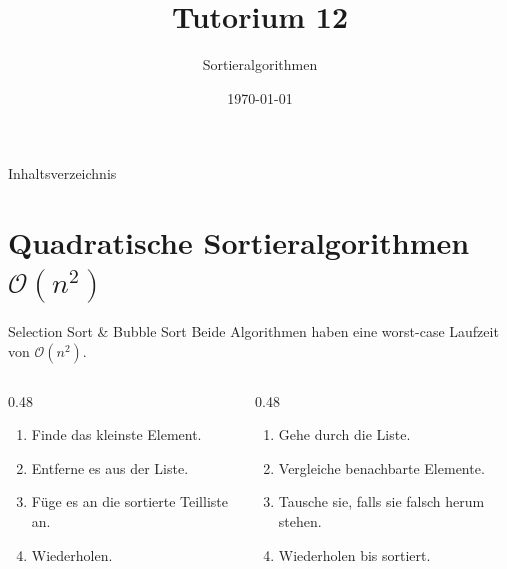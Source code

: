 \documentclass[aspectratio=169,11pt]{beamer}
\title{\textbf{Tutorium 12}}
\subtitle{Sortieralgorithmen}
\institute{Grundlagen der Praktischen Informatik}
\author{}
\date{\today}
\begin{document}
\begin{frame}[plain]
    \titlepage
\end{frame}

\begin{frame}{Inhaltsverzeichnis}
    \tableofcontents
\end{frame}

\section{Quadratische Sortieralgorithmen \texorpdfstring{$\mathcal{O}(n^2)$}{O(n\textasciicircum 2)}}

\begin{frame}{Selection Sort \& Bubble Sort}
    Beide Algorithmen haben eine worst-case Laufzeit von $\mathcal{O}(n^2)$.
    
    \begin{columns}[T]
        \begin{column}{0.48\textwidth}
            \begin{tcolorbox}[modernbox, title=Selection Sort]
                \begin{enumerate}
                    \item Finde das kleinste Element.
                    \item Entferne es aus der Liste.
                    \item Füge es an die sortierte Teilliste an.
                    \item Wiederholen.
                \end{enumerate}
            \end{tcolorbox}
        \end{column}
        \begin{column}{0.48\textwidth}
            \begin{tcolorbox}[modernbox, title=Bubble Sort]
                \begin{enumerate}
                    \item Gehe durch die Liste.
                    \item Vergleiche benachbarte Elemente.
                    \item Tausche sie, falls sie falsch herum stehen.
                    \item Wiederholen bis sortiert.
                \end{enumerate}
            \end{tcolorbox}
        \end{column}
    \end{columns}
\end{frame}
\end{document}
